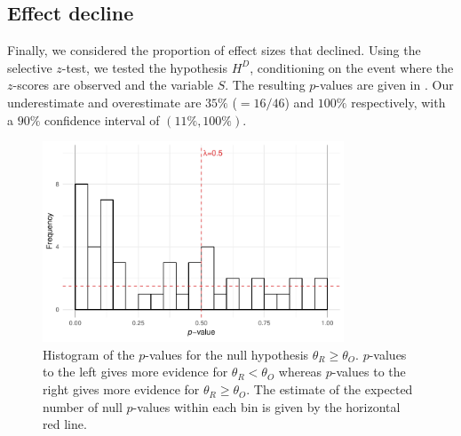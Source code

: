 \documentclass[aoas, preprint]{imsart}
\theoremstyle{definition}
\theoremstyle{custom}
\begin{document}
\subsection{Effect decline}

  Finally, we considered the proportion of effect sizes that declined. Using the selective $z$-test, we tested the hypothesis $H^D$, conditioning on the event where the $z$-scores are observed and the variable $S$. The resulting $p$-values are given in . Our underestimate and overestimate are $35\%$ ($=16/46$) and $100\%$ respectively, with a $90\%$ confidence interval of $(11\%, 100\%)$.
  \begin{figure}[htbp]
    \centering
    \includegraphics[width=0.8\textwidth]{effect-decline}
    \caption{Histogram of the $p$-values for the null hypothesis $\theta_R \ge \theta_O$. $p$-values to the left gives more evidence for $\theta_R < \theta_O$ whereas $p$-values to the right gives more evidence for $\theta_R \ge \theta_O$. The estimate of the expected number of null $p$-values within each bin is given by the horizontal red line.}
  \label{fig:effect-decline}
  \end{figure}
\end{document}
